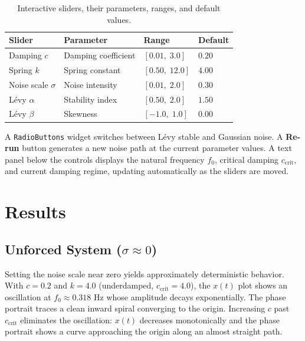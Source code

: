 \documentclass[12pt]{article}
\begin{document}
\begin{table}[H]
    \centering
    \begin{tabular}{llll}
        \hline
        \textbf{Slider} & \textbf{Parameter} & \textbf{Range} & \textbf{Default} \\
        \hline
        Damping $c$           & Damping coefficient & $[0.01,\;3.0]$  & $0.20$ \\
        Spring $k$            & Spring constant     & $[0.50,\;12.0]$ & $4.00$ \\
        Noise scale $\sigma$  & Noise intensity     & $[0.01,\;2.0]$  & $0.30$ \\
        L\'{e}vy $\alpha$     & Stability index     & $[0.50,\;2.0]$  & $1.50$ \\
        L\'{e}vy $\beta$      & Skewness            & $[-1.0,\;1.0]$  & $0.00$ \\
        \hline
    \end{tabular}
    \caption{Interactive sliders, their parameters, ranges, and default values.}
    \label{tab:sliders}
\end{table}

A \texttt{RadioButtons} widget switches between L\'{e}vy stable and Gaussian
noise.
A \textbf{Re-run} button generates a new noise path at the current
parameter values.
A text panel below the controls displays the natural frequency $f_0$,
critical damping $c_{\text{crit}}$, and current damping regime, updating
automatically as the sliders are moved.

\section{Results}

\subsection{Unforced System ($\sigma \approx 0$)}

Setting the noise scale near zero yields approximately deterministic behavior.
With $c = 0.2$ and $k = 4.0$ (underdamped, $c_{\text{crit}} = 4.0$), the
$x(t)$ plot shows an oscillation at $f_0 \approx 0.318$ Hz whose
amplitude decays exponentially.
The phase portrait traces a clean inward spiral converging to the origin.
Increasing $c$ past $c_{\text{crit}}$ eliminates the oscillation: $x(t)$
decreases monotonically and the phase portrait shows a curve approaching
the origin along an almost straight path.
\end{document}
